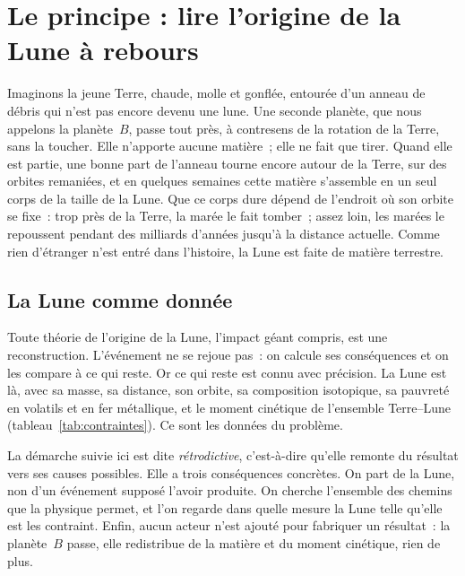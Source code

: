 \documentclass[11pt,a4paper]{article}
\begin{document}
\newpage
\tableofcontents
\newpage

\section{Le principe : lire l'origine de la Lune à rebours}
\label{sec:principe}

\begin{simple}
Imaginons la jeune Terre, chaude, molle et gonflée, entourée d'un anneau de débris qui n'est pas encore devenu une lune. Une seconde planète, que nous appelons la planète~$B$, passe tout près, à contresens de la rotation de la Terre, sans la toucher. Elle n'apporte aucune matière~; elle ne fait que tirer. Quand elle est partie, une bonne part de l'anneau tourne encore autour de la Terre, sur des orbites remaniées, et en quelques semaines cette matière s'assemble en un seul corps de la taille de la Lune. Que ce corps dure dépend de l'endroit où son orbite se fixe~: trop près de la Terre, la marée le fait tomber~; assez loin, les marées le repoussent pendant des milliards d'années jusqu'à la distance actuelle. Comme rien d'étranger n'est entré dans l'histoire, la Lune est faite de matière terrestre.
\end{simple}

\subsection{La Lune comme donnée}

Toute théorie de l'origine de la Lune, l'impact géant compris, est une reconstruction. L'événement ne se rejoue pas~: on calcule ses conséquences et on les compare à ce qui reste. Or ce qui reste est connu avec précision. La Lune est là, avec sa masse, sa distance, son orbite, sa composition isotopique, sa pauvreté en volatils et en fer métallique, et le moment cinétique de l'ensemble Terre--Lune (tableau~\ref{tab:contraintes}). Ce sont les données du problème.

La démarche suivie ici est dite \emph{rétrodictive}, c'est-à-dire qu'elle remonte du résultat vers ses causes possibles. Elle a trois conséquences concrètes. On part de la Lune, non d'un événement supposé l'avoir produite. On cherche l'ensemble des chemins que la physique permet, et l'on regarde dans quelle mesure la Lune telle qu'elle est les contraint. Enfin, aucun acteur n'est ajouté pour fabriquer un résultat~: la planète~$B$ passe, elle redistribue de la matière et du moment cinétique, rien de plus.
\end{document}
